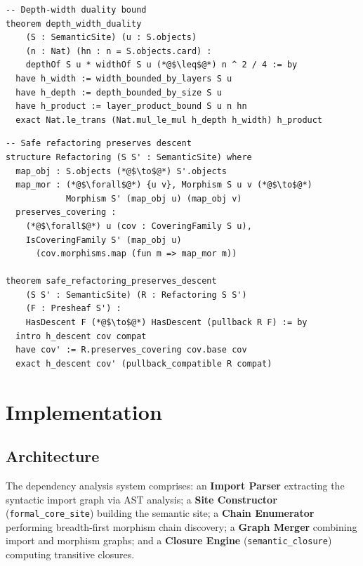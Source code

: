 \documentclass[11pt]{article}
\newcommand{\FormalSite}{\texttt{formal\_core\_site}}
\newcommand{\SemClosure}{\texttt{semantic\_closure}}
\begin{document}
\begin{lstlisting}[style=jugeo-python,title=Depth-Width Duality Formalization]
-- Depth-width duality bound
theorem depth_width_duality
    (S : SemanticSite) (u : S.objects)
    (n : Nat) (hn : n = S.objects.card) :
    depthOf S u * widthOf S u (*@$\leq$@*) n ^ 2 / 4 := by
  have h_width := width_bounded_by_layers S u
  have h_depth := depth_bounded_by_size S u
  have h_product := layer_product_bound S u n hn
  exact Nat.le_trans (Nat.mul_le_mul h_depth h_width) h_product
\end{lstlisting}

\begin{lstlisting}[style=jugeo-python,title=Safe Refactoring Formalization]
-- Safe refactoring preserves descent
structure Refactoring (S S' : SemanticSite) where
  map_obj : S.objects (*@$\to$@*) S'.objects
  map_mor : (*@$\forall$@*) {u v}, Morphism S u v (*@$\to$@*)
            Morphism S' (map_obj u) (map_obj v)
  preserves_covering :
    (*@$\forall$@*) u (cov : CoveringFamily S u),
    IsCoveringFamily S' (map_obj u)
      (cov.morphisms.map (fun m => map_mor m))

theorem safe_refactoring_preserves_descent
    (S S' : SemanticSite) (R : Refactoring S S')
    (F : Presheaf S') :
    HasDescent F (*@$\to$@*) HasDescent (pullback R F) := by
  intro h_descent cov compat
  have cov' := R.preserves_covering cov.base cov
  exact h_descent cov' (pullback_compatible R compat)
\end{lstlisting}

\section{Implementation}\label{sec:implementation}

\subsection{Architecture}
The dependency analysis system comprises: an \textbf{Import Parser}
extracting the syntactic import graph via AST analysis; a \textbf{Site
Constructor} (\FormalSite) building the semantic site; a \textbf{Chain
Enumerator} performing breadth-first morphism chain discovery; a
\textbf{Graph Merger} combining import and morphism graphs; and a
\textbf{Closure Engine} (\SemClosure) computing transitive closures.
\end{document}
